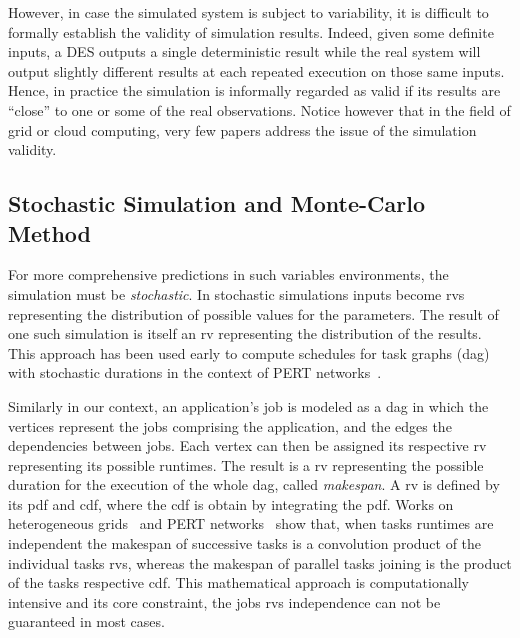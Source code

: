 \documentclass[10pt,conference,compsocconf]{IEEEtran}
\begin{document}
However, in case the simulated system is subject to variability, it is difficult
to formally  establish the  validity of simulation  results. Indeed,  given some
definite inputs,  a DES  outputs a  single deterministic  result while  the real
system  will output  slightly different  results at  each repeated  execution on
those same inputs.  Hence, in practice  the simulation is informally regarded as
valid if  its results  are ``close'' to  one or some  of the  real observations.
Notice however  that in the  field of grid or  cloud computing, very  few papers
address the issue of the simulation validity.

\subsection{Stochastic Simulation and Monte-Carlo Method}

\label{sc:relwork-stochastic}
For  more   comprehensive  predictions  in  such   variables  environments,  the
simulation must  be \emph{stochastic}.  In stochastic simulations  inputs become
\acfp{rv} representing the  distribution of possible values  for the parameters.
The  result  of one  such  simulation  is  itself  an \ac{rv}  representing  the
distribution  of the  results.  This  approach has  been used  early to  compute
schedules for task graphs (\ac{dag}) with stochastic durations in the context of
PERT networks~\cite{Slyke63}.


Similarly in  our context,  an application's  job is modeled  as a  \ac{dag} in
which the vertices represent the jobs  comprising the application, and the edges
the dependencies between jobs.  Each vertex can then be assigned its respective
\ac{rv}  representing   its  possible  runtimes.    The  result  is   a  \ac{rv}
representing  the possible  duration for  the execution  of the  whole \ac{dag},
called  \emph{makespan}. A  \ac{rv} is  defined by  its \ac{pdf}  and \ac{cdf},
where  the   \ac{cdf}  is  obtain   by  integrating  the  \ac{pdf}.    Works  on
heterogeneous  grids~\cite{Li97} and  PERT  networks~\cite{Ludwig01} show  that,
when  tasks runtimes  are  independent the  makespan of  successive  tasks is  a
convolution product  of the individual  tasks \acp{rv}, whereas the  makespan of
parallel tasks  joining is the  product of  the tasks respective  \ac{cdf}. This
mathematical approach is computationally intensive  and its core constraint, the
jobs \acp{rv} independence can not be guaranteed in most cases.
\end{document}
